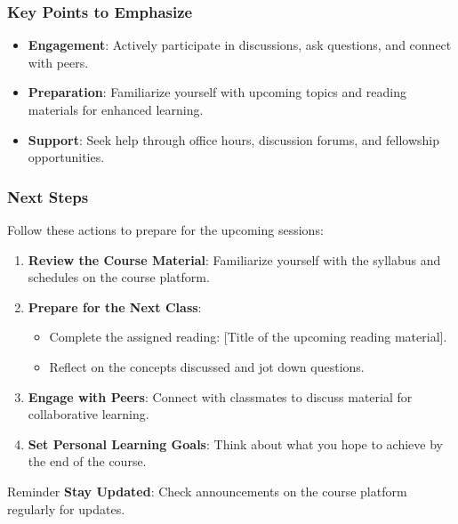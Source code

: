 \documentclass[aspectratio=169]{beamer}
\begin{document}
\begin{frame}[fragile]
    \frametitle{Key Points to Emphasize}
    \begin{itemize}
        \item \textbf{Engagement}: Actively participate in discussions, ask questions, and connect with peers.
        \item \textbf{Preparation}: Familiarize yourself with upcoming topics and reading materials for enhanced learning.
        \item \textbf{Support}: Seek help through office hours, discussion forums, and fellowship opportunities.
    \end{itemize}
\end{frame}

\begin{frame}[fragile]
    \frametitle{Next Steps}
    Follow these actions to prepare for the upcoming sessions:
    
    \begin{enumerate}
        \item \textbf{Review the Course Material}: Familiarize yourself with the syllabus and schedules on the course platform.
        \item \textbf{Prepare for the Next Class}:
        \begin{itemize}
            \item Complete the assigned reading: [Title of the upcoming reading material].
            \item Reflect on the concepts discussed and jot down questions.
        \end{itemize}
        \item \textbf{Engage with Peers}: Connect with classmates to discuss material for collaborative learning.
        \item \textbf{Set Personal Learning Goals}: Think about what you hope to achieve by the end of the course.
    \end{enumerate}

    \begin{block}{Reminder}
        \textbf{Stay Updated}: Check announcements on the course platform regularly for updates.
    \end{block}
\end{frame}
\end{document}
